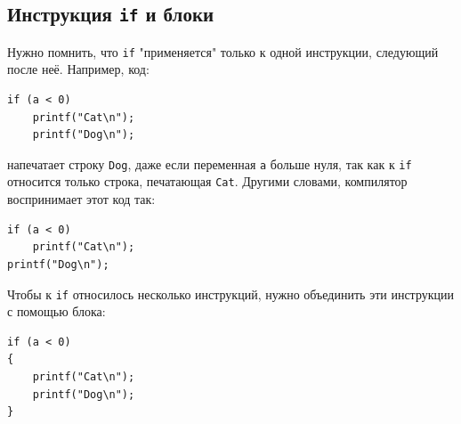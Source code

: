 \documentclass[10pt]{article}
\begin{document}
\subsection*{Инструкция \texttt{if} и блоки}
Нужно помнить, что \texttt{if} "применяется"{} только к одной инструкции, следующий после неё. Например, код:
\begin{lstlisting}
if (a < 0)
    printf("Cat\n");
    printf("Dog\n");
\end{lstlisting}
напечатает строку \texttt{Dog}, даже если переменная \texttt{a} больше нуля, так как к \texttt{if} относится только строка, печатающая \texttt{Cat}. Другими словами, компилятор воспринимает этот код так:
\begin{lstlisting}
if (a < 0)
    printf("Cat\n");
printf("Dog\n");
\end{lstlisting}
Чтобы к \texttt{if} относилось несколько инструкций, нужно объединить эти инструкции с помощью блока:
\begin{lstlisting}
if (a < 0)
{
    printf("Cat\n");
    printf("Dog\n");
}
\end{lstlisting}
\end{document}
